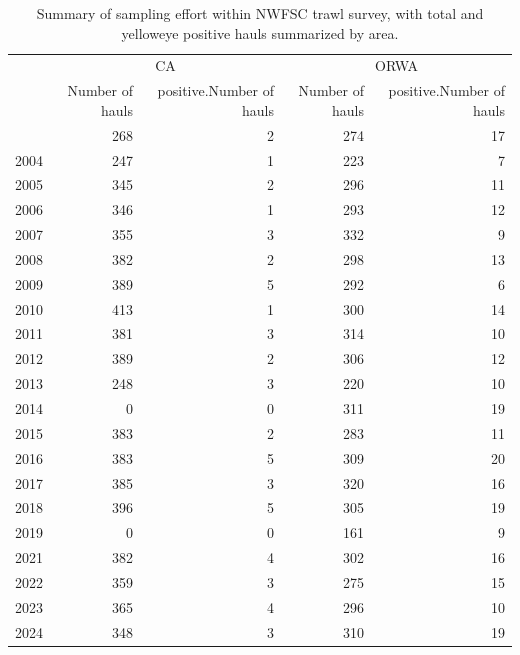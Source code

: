 \documentclass[
]{scrartcl}
\begin{document}
\begin{longtable}{l|rrrr}

\caption{\label{tbl-sampling-effort-nwfsc}Summary of sampling effort
within NWFSC trawl survey, with total and yelloweye positive hauls
summarized by area.}

\tabularnewline

\toprule
 & \multicolumn{2}{c}{CA} & \multicolumn{2}{c}{ORWA} \\ 
\cmidrule(lr){2-3} \cmidrule(lr){4-5}
 & Number of hauls & positive.Number of hauls & Number of hauls & positive.Number of hauls \\ 
\midrule\addlinespace[2.5pt]
2003 & 268 & 2 & 274 & 17 \\ 
2004 & 247 & 1 & 223 & 7 \\ 
2005 & 345 & 2 & 296 & 11 \\ 
2006 & 346 & 1 & 293 & 12 \\ 
2007 & 355 & 3 & 332 & 9 \\ 
2008 & 382 & 2 & 298 & 13 \\ 
2009 & 389 & 5 & 292 & 6 \\ 
2010 & 413 & 1 & 300 & 14 \\ 
2011 & 381 & 3 & 314 & 10 \\ 
2012 & 389 & 2 & 306 & 12 \\ 
2013 & 248 & 3 & 220 & 10 \\ 
2014 & 0 & 0 & 311 & 19 \\ 
2015 & 383 & 2 & 283 & 11 \\ 
2016 & 383 & 5 & 309 & 20 \\ 
2017 & 385 & 3 & 320 & 16 \\ 
2018 & 396 & 5 & 305 & 19 \\ 
2019 & 0 & 0 & 161 & 9 \\ 
2021 & 382 & 4 & 302 & 16 \\ 
2022 & 359 & 3 & 275 & 15 \\ 
2023 & 365 & 4 & 296 & 10 \\ 
2024 & 348 & 3 & 310 & 19 \\ 
\bottomrule

\end{longtable}

\endgroup

\begingroup
\fontsize{9.0pt}{10.8pt}\selectfont
\end{document}
